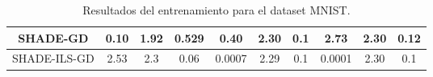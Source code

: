 \begin{table}[H]
{\begin{tabular}{|c|ccc|ccc|ccc|}
SHADE-GD                                          & \multicolumn{1}{c|}{0.10}          & \multicolumn{1}{c|}{1.92}          & 0.529         & \multicolumn{1}{c|}{0.40}          & \multicolumn{1}{c|}{2.30}          & 0.1           & \multicolumn{1}{c|}{2.73}          & \multicolumn{1}{c|}{2.30}          & 0.12          \\ \hline
SHADE-ILS-GD                                      & \multicolumn{1}{c|}{2.53}          & \multicolumn{1}{c|}{2.3}           & 0.06          & \multicolumn{1}{c|}{0.0007}        & \multicolumn{1}{c|}{2.29}          & 0.1           & \multicolumn{1}{c|}{0.0001}        & \multicolumn{1}{c|}{2.30}          & 0.1           \\ \hline
\end{tabular}}
\caption{Resultados del entrenamiento para el dataset MNIST.}
\label{tab:mnist}
\end{table}



